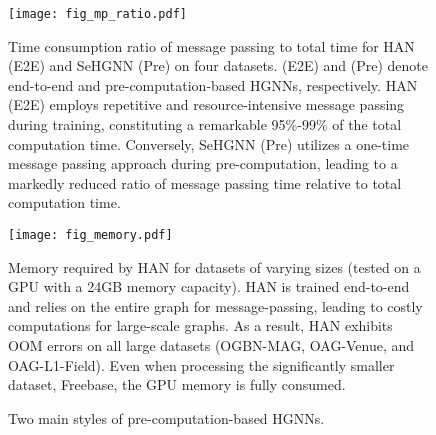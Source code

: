 \documentclass[lettersize,journal]{IEEEtran}
\begin{document}
\begin{figure}[!tp]
\vspace{-2mm}
\centering\texttt{[image: fig\_mp\_ratio.pdf]}
\vspace{-4mm}
\caption{
Time consumption ratio of message passing to total time for HAN (E2E) and SeHGNN (Pre) on four datasets.
(E2E) and (Pre) denote end-to-end and pre-computation-based HGNNs, respectively.
HAN (E2E) employs repetitive and resource-intensive message passing during training, constituting a remarkable 95\%-99\% of the total computation time.
Conversely, SeHGNN (Pre) utilizes a one-time message passing approach during pre-computation, leading to a markedly reduced ratio of message passing time relative to total computation time.
}
 \label{fig:message_passing_ratio}
\end{figure}



\begin{figure}[!tp]
\vspace{-2mm}
\centering\texttt{[image: fig\_memory.pdf]}
\vspace{-8mm}
\caption{
Memory required by HAN for datasets of varying sizes (tested on a GPU with a 24GB memory capacity).
HAN is trained end-to-end and relies on the entire graph for message-passing, leading to costly computations for large-scale graphs.
As a result, HAN exhibits OOM errors on all large datasets (OGBN-MAG, OAG-Venue, and OAG-L1-Field).
Even when processing the significantly smaller dataset, Freebase, the GPU memory is fully consumed.
}
 \label{fig:memory}
 \vspace{-2mm}
\end{figure}




\begin{figure}[!tp]
\vspace{-2mm}
\centering
{}
\hfill
{}
\caption{Two main styles of pre-computation-based HGNNs.}
\label{fig:two_styles} \vspace{-6mm}
\end{figure}
\end{document}

